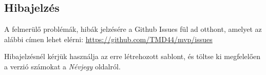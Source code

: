 \subsection{Hibajelzés}
A felmerülő problémák, hibák jelzésére a Github Issues fül ad otthont, amelyet az alábbi címen lehet elérni: \url{https://github.com/TMD44/mvp/issues}

Hibajelzésnél kérjük használja az erre létrehozott sablont, és töltse ki megfelelően a verzió számokat a {\it Névjegy} oldalról.
